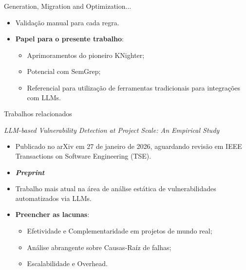 \documentclass[
    aspectratio=169,   %
    12pt,
    brazil
]{beamer}
\newcommand{\minhaspaginas}{}
\begin{document}
\begin{frame}{Generation, Migration and Optimization...}
  \begin{itemize}
    \item Validação manual para cada regra.
    \item \textbf{Papel para o presente trabalho}:
      \begin{itemize}
        \item Aprimoramentos do pioneiro KNighter;
        \item Potencial com SemGrep;
        \item Referencial para utilização de ferramentas tradicionais para integrações com LLMs.
      \end{itemize}
  \end{itemize}
\end{frame}

\renewcommand{\minhaspaginas}{\small 41 - 43}
\begin{frame}{Trabalhos relacionados}
  \begin{block}{\textit{LLM-based Vulnerability Detection at Project Scale: An Empirical Study} \cite{li2026llmbased}}
    \begin{itemize}
      \item Publicado no arXiv em 27 de janeiro de 2026, aguardando revisão em IEEE Transactions on Software Engineering (TSE).
      \item \textbf{\textit{Preprint}}
      \item Trabalho mais atual na área de análise estática de vulnerabilidades automatizados via LLMs.
      \item \textbf{Preencher as lacunas}:
        \begin{itemize}
          \item Efetividade e Complementaridade em projetos de mundo real;
          \item Análise abrangente sobre Causas-Raíz de falhas;
          \item Escalabilidade e Overhead.
        \end{itemize}
    \end{itemize}
  \end{block}
\end{frame}
\end{document}
